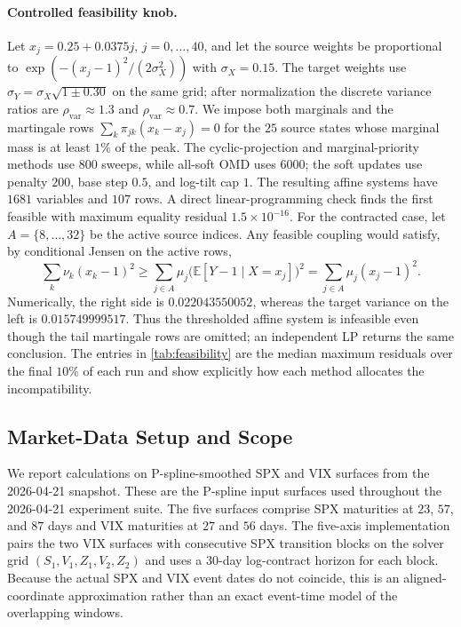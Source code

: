 \documentclass{article}
\newcommand{\Embb}{\mathbb{E}}
\begin{document}
\paragraph{Controlled feasibility knob.}
Let $x_j=0.25+0.0375j$, $j=0,\ldots,40$, and let the source weights be proportional to $\exp(-(x_j-1)^2/(2\sigma_X^2))$ with $\sigma_X=0.15$.
The target weights use $\sigma_Y=\sigma_X\sqrt{1\pm0.30}$ on the same grid; after normalization the discrete variance ratios are $\rho_{\mathrm{var}}\approx1.3$ and $\rho_{\mathrm{var}}\approx0.7$.
We impose both marginals and the martingale rows $\sum_k\pi_{jk}(x_k-x_j)=0$ for the $25$ source states whose marginal mass is at least $1\%$ of the peak.
The cyclic-projection and marginal-priority methods use $800$ sweeps, while all-soft OMD uses $6000$; the soft updates use penalty $200$, base step $0.5$, and log-tilt cap $1$.
The resulting affine systems have $1681$ variables and $107$ rows.
A direct linear-programming check finds the first feasible with maximum equality residual $1.5\times10^{-16}$.
For the contracted case, let $A=\{8,\ldots,32\}$ be the active source indices.
Any feasible coupling would satisfy, by conditional Jensen on the active rows,
\begin{equation}\label{eq:synthetic_infeasibility_certificate}
\sum_k\nu_k(x_k-1)^2
\geq
\sum_{j\in A}\mu_j\bigl(\Embb[Y-1\mid X=x_j]\bigr)^2
=\sum_{j\in A}\mu_j(x_j-1)^2.
\end{equation}
Numerically, the right side is $0.022043550052$, whereas the target variance on the left is $0.015749999517$.
Thus the thresholded affine system is infeasible even though the tail martingale rows are omitted; an independent LP returns the same conclusion.
The entries in \cref{tab:feasibility} are the median maximum residuals over the final $10\%$ of each run and show explicitly how each method allocates the incompatibility.

\subsection{Market-Data Setup and Scope}\label{subsec:market_setup}

We report calculations on P-spline-smoothed SPX and VIX surfaces from the 2026-04-21 snapshot.
These are the P-spline input surfaces used throughout the 2026-04-21 experiment suite.
The five surfaces comprise SPX maturities at $23$, $57$, and $87$ days and VIX maturities at $27$ and $56$ days.
The five-axis implementation pairs the two VIX surfaces with consecutive SPX transition blocks on the solver grid
$(S_1,V_1,Z_1,V_2,Z_2)$ and uses a 30-day log-contract horizon for each block.
Because the actual SPX and VIX event dates do not coincide, this is an aligned-coordinate approximation rather than an exact event-time model of the overlapping windows.
\end{document}
